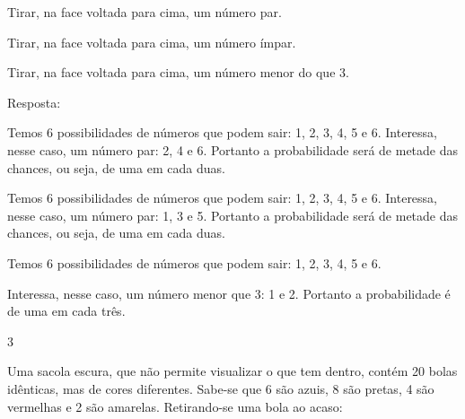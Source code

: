 \begin{multicols}{2}
{\begin{escolha}
\begin{escolha}
\item
  Tirar, na face voltada para cima, um número par.
\end{escolha}


\begin{escolha}

\item
  Tirar, na face voltada para cima, um número ímpar.
\end{escolha}


\begin{escolha}

\item
  Tirar, na face voltada para cima, um número menor do que 3.
\end{escolha}


Resposta:

\begin{escolha}

\item
  Temos 6 possibilidades de números que podem sair: 1, 2, 3, 4, 5 e 6.
  Interessa, nesse caso, um número par: 2, 4 e 6. Portanto a probabilidade será de metade das chances, ou seja, de uma em cada duas.
\end{escolha}

\begin{escolha}

\item
  Temos 6 possibilidades de números que podem sair: 1, 2, 3, 4, 5 e 6.
  Interessa, nesse caso, um número par: 1, 3 e 5. Portanto a probabilidade será de metade das chances, ou seja, de uma em cada duas.
\end{escolha}



\begin{escolha}

\item
  Temos 6 possibilidades de números que podem sair: 1, 2, 3, 4, 5 e 6.
\end{escolha}

Interessa, nesse caso, um número menor que 3: 1 e 2. Portanto a probabilidade é de uma em cada três.


\num{3}

Uma sacola escura, que não permite visualizar o que tem dentro, contém
20 bolas idênticas, mas de cores diferentes. Sabe-se que 6 são azuis, 8
são pretas, 4 são vermelhas e 2 são amarelas. Retirando-se uma bola ao
acaso:


\end{escolha}}
\end{multicols}
